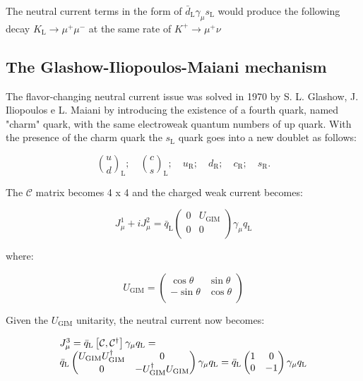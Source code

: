 The neutral current terms in the form of $\bar{d}_{\text{L}}\gamma_{\mu}s_{\text{L}}$ would produce the following decay $K_{\text{L}} \longrightarrow \mu^{+}\mu^{-}$ at the same rate of $K^{+} \longrightarrow \mu^{+}\nu$

\subsection{The Glashow-Iliopoulos-Maiani mechanism}

The flavor-changing neutral current issue was solved in 1970 by S. L. Glashow, J. Iliopoulos e L. Maiani \cite{Glashow:1970gm} by introducing the existence of a fourth quark, named "charm" quark, with the same electroweak quantum numbers of up quark. With the presence of the charm quark the $s_{\text{L}}$ quark goes into a new doublet as follows: 

\begin{equation}
\binom{u}{d}_{\text{L}}; \quad \binom{c}{s}_{\text{L}}; \quad u_{\text{R}}; \quad d_{\text{R}}; \quad c_{\text{R}}; \quad s_{\text{R}}.
\end{equation}

The $\mathcal{C}$ matrix becomes 4 x 4 and the charged weak current becomes:

\begin{equation}
J^{1}_{\mu} + i J^{2}_{\mu} = \bar{q}_{\text{L}} 
\begin{pmatrix}
0 &U_{\text{GIM}} \\
0 &0 \\
\end{pmatrix}
\gamma_{\mu}q_{\text{L}}
\label{eq::cab_current_gim}
\end{equation}

where:

\begin{equation}
U_{\text{GIM}} =
\begin{pmatrix}
\cos\theta &\sin\theta \\
-\sin\theta &\cos\theta \\
\end{pmatrix}
\end{equation}

Given the $U_{\text{GIM}}$ unitarity, the neutral current now becomes:

\begin{equation}
	\begin{array}{l c l}
		J^{3}_{\mu} = \bar{q}_{\text{L}}\left[\mathcal{C}, \mathcal{C}^{\dagger} \right]\gamma_{\mu}q_{\text{L}} = \\
		\bar{q}_{\text{L}}
		\begin{pmatrix}
			U_{\text{GIM}}U_{\text{GIM}}^{\dagger} &0 \\
			0 &-U_{\text{GIM}}^{\dagger}U_{\text{GIM}} \\
		\end{pmatrix}
		\gamma_{\mu}q_{\text{L}} = \bar{q}_{\text{L}}
		\begin{pmatrix}
			1 &0 \\
			0 &-1 \\
		\end{pmatrix}
		\gamma_{\mu}q_{\text{L}}
	\end{array}
\end{equation}

